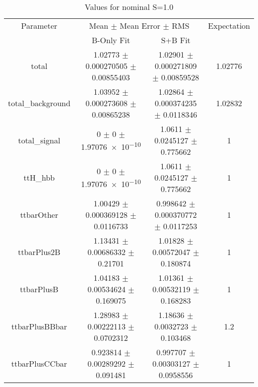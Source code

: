 \begin{table}
\centering
\caption{Values for nominal S=1.0}
\begin{tabular}{cccc}
\toprule
Parameter & \multicolumn{2}{c}{Mean $\pm$ Mean Error $\pm$ RMS} & Expectation\\
 & B-Only Fit & S+B Fit & \\
\midrule
total & \num{1.02773} $\pm$ \num{0.000270505} $\pm$ \num{0.00855403} & \num{1.02901} $\pm$ \num{0.000271809} $\pm$ \num{0.00859528} & \num{1.02776}\\
total\_background & \num{1.03952} $\pm$ \num{0.000273608} $\pm$ \num{0.00865238} & \num{1.02864} $\pm$ \num{0.000374235} $\pm$ \num{0.0118346} & \num{1.02832}\\
total\_signal & \num{0} $\pm$ \num{0} $\pm$ \num{1.97076e-10} & \num{1.0611} $\pm$ \num{0.0245127} $\pm$ \num{0.775662} & \num{1}\\
ttH\_hbb & \num{0} $\pm$ \num{0} $\pm$ \num{1.97076e-10} & \num{1.0611} $\pm$ \num{0.0245127} $\pm$ \num{0.775662} & \num{1}\\
ttbarOther & \num{1.00429} $\pm$ \num{0.000369128} $\pm$ \num{0.0116733} & \num{0.998642} $\pm$ \num{0.000370772} $\pm$ \num{0.0117253} & \num{1}\\
ttbarPlus2B & \num{1.13431} $\pm$ \num{0.00686332} $\pm$ \num{0.21701} & \num{1.01828} $\pm$ \num{0.00572047} $\pm$ \num{0.180874} & \num{1}\\
ttbarPlusB & \num{1.04183} $\pm$ \num{0.00534624} $\pm$ \num{0.169075} & \num{1.01361} $\pm$ \num{0.00532119} $\pm$ \num{0.168283} & \num{1}\\
ttbarPlusBBbar & \num{1.28983} $\pm$ \num{0.00222113} $\pm$ \num{0.0702312} & \num{1.18636} $\pm$ \num{0.0032723} $\pm$ \num{0.103468} & \num{1.2}\\
ttbarPlusCCbar & \num{0.923814} $\pm$ \num{0.00289292} $\pm$ \num{0.091481} & \num{0.997707} $\pm$ \num{0.00303127} $\pm$ \num{0.0958556} & \num{1}\\
\bottomrule
\end{tabular}
\end{table}